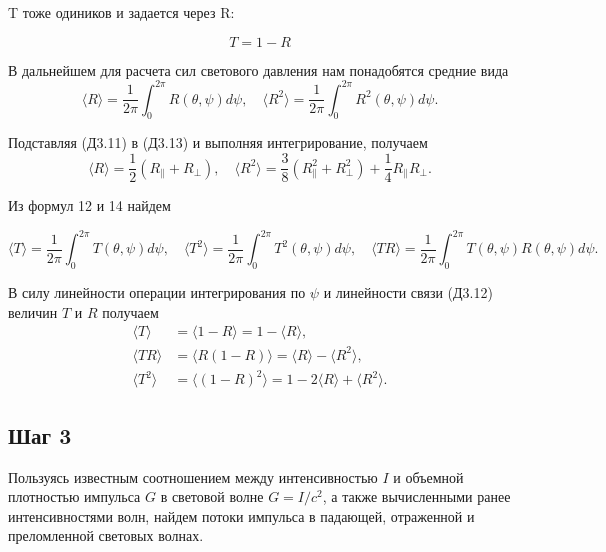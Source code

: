 \documentclass[a4paper]{article}
\begin{document}
T тоже одиников и задается через R:

\[ T = 1 - R \tag{12}\] 

В дальнейшем для расчета сил светового давления нам понадобятся средние вида
\begin{equation}
    \langle R \rangle = \frac{1}{2\pi} \int_0^{2\pi} R(\theta, \psi) d\psi,\quad 
    \langle R^2 \rangle = \frac{1}{2\pi} \int_0^{2\pi} R^2(\theta, \psi) d\psi. \tag{13}
\end{equation}

Подставляя (Д3.11) в (Д3.13) и выполняя интегрирование, получаем
\begin{equation}
    \langle R \rangle = \frac{1}{2}(R_{\parallel} + R_{\perp}), \quad 
    \langle R^2 \rangle = \frac{3}{8}(R_{\parallel}^2 + R_{\perp}^2) + \frac{1}{4}R_{\parallel}R_{\perp}. \tag{14}
\end{equation}

Из формул 12 и 14 найдем

\begin{equation}
    \langle T \rangle = \frac{1}{2\pi} \int_0^{2\pi} T(\theta, \psi) d\psi, \quad 
    \langle T^2 \rangle = \frac{1}{2\pi} \int_0^{2\pi} T^2(\theta, \psi) d\psi,\quad 
    \langle TR \rangle = \frac{1}{2\pi} \int_0^{2\pi} T(\theta, \psi) R(\theta, \psi) d\psi. \tag{15}
\end{equation}

В силу линейности операции интегрирования по $\psi$ и линейности связи (Д3.12) величин $T$ и $R$ получаем
\begin{align}
    \langle T \rangle &= \langle 1 - R \rangle = 1 - \langle R \rangle, \tag{16} \\
    \langle TR \rangle &= \langle R(1 - R) \rangle = \langle R \rangle - \langle R^2 \rangle, \label{eq:D3.16} \tag{16}\\
    \langle T^2 \rangle &= \langle (1 - R)^2 \rangle = 1 - 2\langle R \rangle + \langle R^2 \rangle. \tag{16}
\end{align}

\subsection{Шаг 3}

Пользуясь известным соотношением между интенсивностью $I$ и объемной плотностью импульса $G$ в световой волне $G = I/c^2$, а также вычисленными ранее интенсивностями волн, найдем потоки импульса в падающей, отраженной и преломленной световых волнах.

\par
\end{document}
